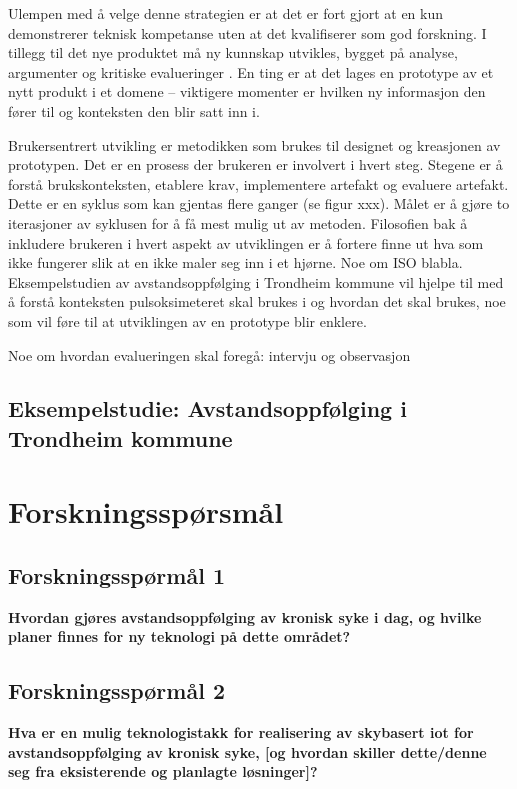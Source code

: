 Ulempen med å velge denne strategien er at det er fort gjort at en kun demonstrerer
teknisk kompetanse uten at det kvalifiserer som god forskning. I tillegg til det nye produktet må ny kunnskap utvikles, bygget på analyse, argumenter
og kritiske evalueringer \citep[s. 109]{oates}. En ting er at det lages en prototype av et nytt produkt i et domene -- viktigere momenter er hvilken ny informasjon den fører
til og konteksten den blir satt inn i.

Brukersentrert utvikling er metodikken som brukes til designet og kreasjonen av prototypen. Det er en prosess der brukeren er involvert i hvert steg.
Stegene er å forstå brukskonteksten, etablere krav, implementere artefakt og evaluere artefakt. Dette er en syklus som kan gjentas flere ganger (se figur xxx).
Målet er å gjøre to iterasjoner av syklusen for å få mest mulig ut av metoden. Filosofien bak å inkludere brukeren i hvert aspekt av utviklingen er å fortere
finne ut hva som ikke fungerer slik at en ikke maler seg inn i et hjørne. Noe om ISO blabla. Eksempelstudien av avstandsoppfølging i Trondheim kommune vil
hjelpe til med å forstå konteksten pulsoksimeteret skal brukes i og hvordan det skal brukes, noe som vil føre til at utviklingen av en prototype blir enklere.

Noe om hvordan evalueringen skal foregå: intervju og observasjon


\subsection{Eksempelstudie: Avstandsoppfølging i Trondheim kommune}
\blindtext

\section{Forskningsspørsmål}
\subsection{Forskningsspørmål 1}
\textbf{Hvordan gjøres avstandsoppfølging av kronisk syke i dag, og hvilke planer finnes for ny teknologi på dette området?}

\subsection{Forskningsspørmål 2}
\textbf{Hva er en mulig teknologistakk for realisering av skybasert \gls{iot} for avstandsoppfølging av kronisk syke,
    [og hvordan skiller dette/denne seg fra eksisterende og planlagte løsninger]?}
    
